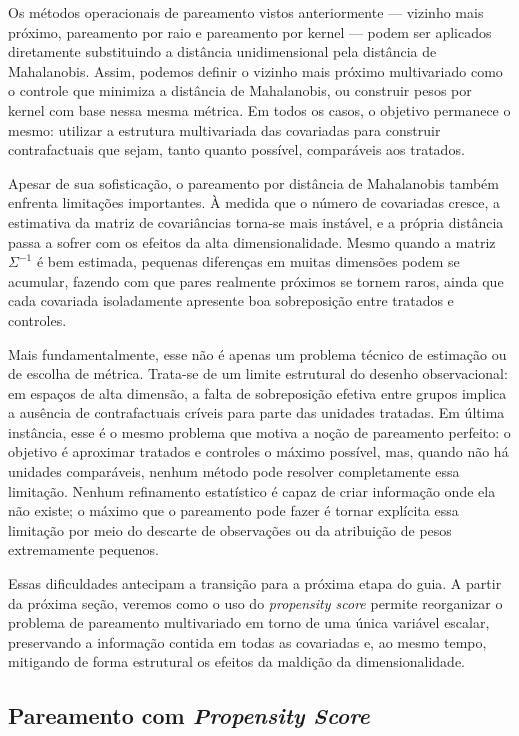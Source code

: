 Os métodos operacionais de pareamento vistos anteriormente — vizinho mais próximo, pareamento por raio e pareamento por kernel — podem ser aplicados diretamente substituindo a distância unidimensional pela distância de Mahalanobis. Assim, podemos definir o vizinho mais próximo multivariado como o controle que minimiza a distância de Mahalanobis, ou construir pesos por kernel com base nessa mesma métrica. Em todos os casos, o objetivo permanece o mesmo: utilizar a estrutura multivariada das covariadas para construir contrafactuais que sejam, tanto quanto possível, comparáveis aos tratados.

Apesar de sua sofisticação, o pareamento por distância de Mahalanobis também enfrenta limitações importantes. À medida que o número de covariadas cresce, a estimativa da matriz de covariâncias torna-se mais instável, e a própria distância passa a sofrer com os efeitos da alta dimensionalidade. Mesmo quando a matriz $\Sigma^{-1}$ é bem estimada, pequenas diferenças em muitas dimensões podem se acumular, fazendo com que pares realmente próximos se tornem raros, ainda que cada covariada isoladamente apresente boa sobreposição entre tratados e controles.

Mais fundamentalmente, esse não é apenas um problema técnico de estimação ou de escolha de métrica. Trata-se de um limite estrutural do desenho observacional: em espaços de alta dimensão, a falta de sobreposição efetiva entre grupos implica a ausência de contrafactuais críveis para parte das unidades tratadas. Em última instância, esse é o mesmo problema que motiva a noção de pareamento perfeito: o objetivo é aproximar tratados e controles o máximo possível, mas, quando não há unidades comparáveis, nenhum método pode resolver completamente essa limitação. Nenhum refinamento estatístico é capaz de criar informação onde ela não existe; o máximo que o pareamento pode fazer é tornar explícita essa limitação por meio do descarte de observações ou da atribuição de pesos extremamente pequenos.


Essas dificuldades antecipam a transição para a próxima etapa do guia. A partir da próxima seção, veremos como o uso do \textit{propensity score} permite reorganizar o problema de pareamento multivariado em torno de uma única variável escalar, preservando a informação contida em todas as covariadas e, ao mesmo tempo, mitigando de forma estrutural os efeitos da maldição da dimensionalidade.

\subsection{Pareamento com \textit{Propensity Score}}

